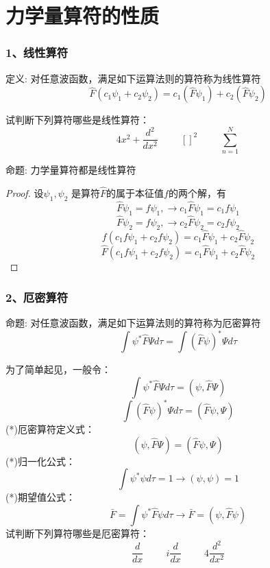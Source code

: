 \section{力学量算符的性质}

\begin{frame} [allowframebreaks=]
    \frametitle{1、线性算符}
    \begin{tcolorbox1}{定义:}
        对任意波函数，满足如下运算法则的算符称为线性算符\\
        $$\hat{F}(c_1\psi_1+c_2\psi_2 ) = c_1(\hat{F}\psi_1)+c_2(\hat{F}\psi_2 )$$
    \end{tcolorbox1}
    试判断下列算符哪些是线性算符：\\
    $$4x^2+\frac{d^2}{dx^2} \hspace{1cm}  []^2 \hspace{1cm} \sum\limits_{n=1}^{N}$$
\end{frame} 

\begin{frame} [allowframebreaks=]
    \begin{tcolorbox1}{命题:}
      力学量算符都是线性算符  
    \end{tcolorbox1}
    \begin{proof}
        设$\psi_1, \psi_2$ 是算符$\hat{F}$的属于本征值$f$的两个解，有\\
        $$\hat{F}\psi_1=f\psi_1, \to c_1\hat{F}\psi_1=c_1f\psi_1 $$
        $$\hat{F}\psi_2=f\psi_2, \to c_2\hat{F}\psi_2=c_2f\psi_2 $$
        $$f(c_1f\psi_1+c_2f\psi_2)=c_1\hat{F}\psi_1+c_2\hat{F}\psi_2$$
        $$\hat{F}(c_1f\psi_1+c_2f\psi_2)=c_1\hat{F}\psi_1+c_2\hat{F}\psi_2$$
    \end{proof}
\end{frame} 

\begin{frame} [allowframebreaks=]
    \frametitle{2、厄密算符}
    \begin{tcolorbox1}{命题:}
    对任意波函数，满足如下运算法则的算符称为厄密算符\\
        $$\int \psi^* \hat{F} \Psi d\tau =\int (\hat{F}\psi)^* \Psi d\tau $$
    \end{tcolorbox1}
    为了简单起见，一般令： $$\int \psi^* \hat{F} \Psi d\tau= (\psi,\hat{F}\Psi)$$
    $$\int (\hat{F}\psi)^* \Psi d\tau = (\hat{F}\psi,\Psi) $$
    (*)厄密算符定义式： $$(\psi,\hat{F}\Psi)= (\hat{F}\psi,\Psi) $$
    (*)归一化公式： $$ \int \psi^{*} \psi d \tau=1 \to (\psi,\psi)=1$$
    (*)期望值公式： $$ \bar{F}=\int \psi^{*} \hat{F} \psi d \tau \to \bar{F}= (\psi,\hat{F}\psi) $$
    试判断下列算符哪些是厄密算符：\\
    $$\frac{d}{dx} \hspace{1cm}  i\frac{d}{dx} \hspace{1cm} 4\frac{d^2}{dx^2} $$
\end{frame} 


